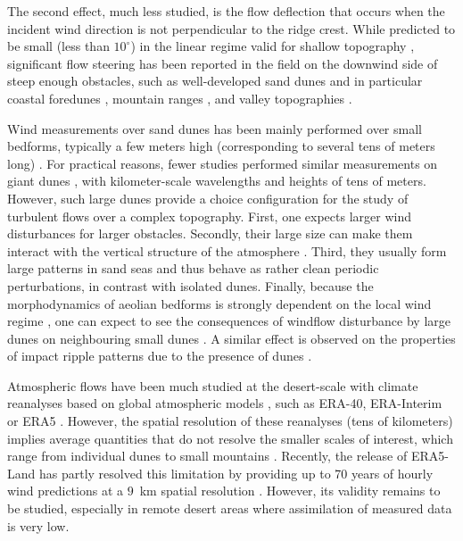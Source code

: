 The second effect, much less studied, is the flow deflection that occurs when the incident wind direction is not perpendicular to the ridge crest. While predicted to be small (less than $10^{\circ}$) in the linear regime valid for shallow topography \citep{Gadal2019}, significant flow steering has been reported in the field on the downwind side of steep enough obstacles, such as well-developed sand dunes \citep{Tsoar1983, Sweet1990, Walker2002, Smith2017} and in particular coastal foredunes \citep[e.g.][]{Hunter1983, rasmussen1989, Walker2006, Walker2009, Hesp2015, Walker2017, deWinter2020}, mountain ranges \citep{Kim2000, Lewis2008, Fernando2019}, and valley topographies \citep{Wiggs2002, Garvey2005}.

Wind measurements over sand dunes has been mainly performed over small bedforms, typically a few meters high (corresponding to several tens of meters long) \citep[e.g.][]{Mulligan1988, Hesp1989, Lancaster1996, MckennaNeuman1997, Sauermann2003, Andreotti2002, Walker2002, Weaver2011}. For practical reasons, fewer studies performed similar measurements on giant dunes \citep{Havholm1988}, with kilometer-scale wavelengths and heights of tens of meters. However, such large dunes provide a choice configuration for the study of turbulent flows over a complex topography. First, one expects larger wind disturbances for larger obstacles. Secondly, their large size can make them interact with the vertical structure of the atmosphere \citep{Andreotti2009}. Third, they usually form large patterns in sand seas and thus behave as rather clean periodic perturbations, in contrast with isolated dunes. Finally, because the morphodynamics of aeolian bedforms is strongly dependent on the local wind regime \citep{Livingstone2019}, one can expect to see the consequences of windflow disturbance by large dunes on neighbouring small dunes \citep{Brookfield1977, Ewing2006}. A similar effect is observed on the properties of impact ripple patterns due to the presence of dunes \citep{Howard1977, Hood2021}.

Atmospheric flows have been much studied at the desert-scale with climate reanalyses based on global atmospheric models \citep{Blumberg1996, Livingstone2010, Ashkenazy2012, Jolivet2021, Hu2021, gunn2021}, such as ERA-40, ERA-Interim or ERA5 \citep{Uppala2005, Dee2011, Hersbach2020}. However, the spatial resolution of these reanalyses (tens of kilometers) implies average quantities that do not resolve the smaller scales of interest, which range from individual dunes to small mountains \citep{Livingstone2010}. Recently, the release of ERA5-Land has partly resolved this limitation by providing up to 70 years of hourly wind predictions at a $9$~km spatial resolution \citep{munoz2021}. However, its validity remains to be studied, especially in remote desert areas where assimilation of measured data is very low.

